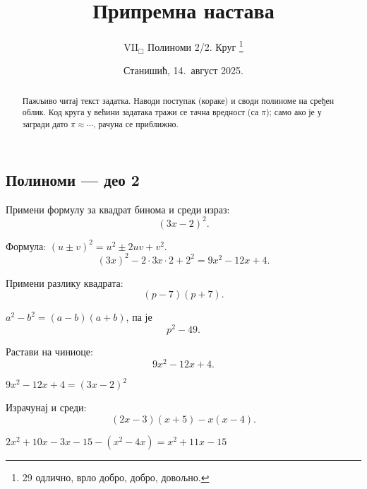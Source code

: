 \documentclass[11pt,a5paper,twoside,addpoints,answers]{exam} %
\title{Припремна настава}
\author{$\mathrm{VII}_\Box$ Полиноми 2/2. Круг
  \thanks{29 одлично,\; 22 врло добро,\; 15 добро,\; 8 довољно.}
}
\date{Станишић, 14.\ август 2025.}
\newcommand{\variant}[3]{#1}
\begin{document}
\maketitle
\thispagestyle{headandfoot}

\ifprintanswers\else
\begin{flushleft}\scriptsize
\gradetable[h]
\end{flushleft}
\fi

\begin{abstract}
Пажљиво читај текст задатка. Наводи поступак (кораке) и своди полиноме на сређен облик.
Код круга у већини задатака тражи се тачна вредност (са $\pi$); само ако је у загради дато $\pi\approx\cdots$, рачуна се приближно.
\end{abstract}

\begin{questions}

\section*{Полиноми — део 2}

\question[3]
Примени формулу за квадрат бинома и среди израз:
\[
\variant{(3x-2)^2}{(2a+5)^2}{(4y-1)^2}.
\]
\begin{solution}[\stretch 2]
Формула: $(u\pm v)^2=u^2\pm 2uv+v^2$.
\[
\variant{
(3x)^2-2\cdot 3x\cdot 2+2^2=9x^2-12x+4
}{
(2a)^2+2\cdot 2a\cdot 5+5^2=4a^2+20a+25
}{
(4y)^2-2\cdot 4y\cdot 1+1^2=16y^2-8y+1}.
\]
\end{solution}

\question[2]
Примени разлику квадрата:
\[
\variant{(p-7)(p+7)}{(6x-5)(6x+5)}{(m-3n)(m+3n)}.
\]
\begin{solution}[\stretch 1]
$a^2-b^2=(a-b)(a+b)$, па је
\[
\variant{p^2-49}{36x^2-25}{m^2-9n^2}.
\]
\end{solution}

\question[3]
Растави на чиниоце:
\[
\variant{9x^2-12x+4}{25a^2-1}{8y^2+12y}.
\]
\begin{solution}[\stretch 2]
\variant{
$9x^2-12x+4=(3x-2)^2$
}{
$25a^2-1=(5a-1)(5a+1)$
}{
$8y^2+12y=4y(2y+3)$.
}
\end{solution}

\question[4]
Израчунај и среди:
\[
\variant{
(2x-3)(x+5)-x(x-4)
}{
(3a+2)(a-1)+ (a-4)(a+4)
}{
(5y-1)(y-2)- (2y-3)^2
}.
\]
\begin{solution}[\stretch 3]
\variant{
$2x^2+10x-3x-15-(x^2-4x)=
x^2+11x-15$
}{
$3a^2-3a+2a-2 + (a^2-16)=4a^2-a-18$
}{
$5y^2-10y -y+2 -\big(4y^2-12y+9\big)
= y^2+1y-7$.
}
\end{solution}


\end{questions}
\end{document}
